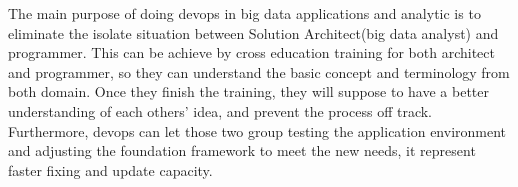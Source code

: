 \documentclass[sigconf]{acmart}
\begin{document}
The main purpose of doing devops in big data applications and analytic is to eliminate the isolate situation between Solution Architect(big data analyst) and programmer. This can be achieve by cross education training for both architect and programmer, so they can understand the basic concept and terminology from both domain. Once they finish the training, they will suppose to have a better understanding of each others' idea, and prevent the process off track. Furthermore, devops can let those two group testing the application environment and adjusting the foundation framework to meet the new needs, it represent faster fixing and update capacity. 







 
\end{document}
